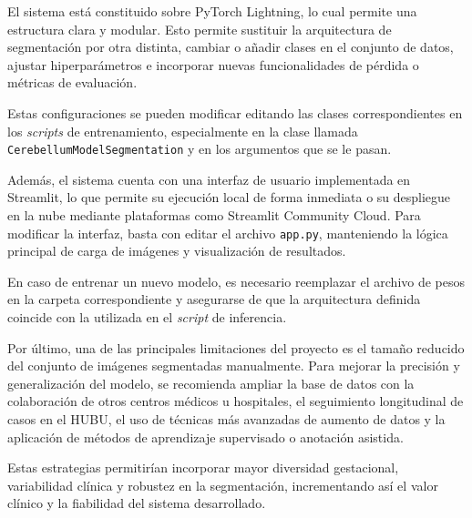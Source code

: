 El sistema está constituido sobre PyTorch Lightning, lo cual permite una estructura clara y modular. Esto permite sustituir la arquitectura de segmentación por otra distinta, cambiar o añadir clases en el conjunto de datos, ajustar hiperparámetros e incorporar nuevas funcionalidades de pérdida o métricas de evaluación.

Estas configuraciones se pueden modificar editando las clases correspondientes en los \textit{scripts} de entrenamiento, especialmente en la clase llamada \texttt{CerebellumModelSegmentation} y en los argumentos que se le pasan.

Además, el sistema cuenta con una interfaz de usuario implementada en Streamlit, lo que permite su ejecución local de forma inmediata o su despliegue en la nube mediante plataformas como Streamlit Community Cloud. Para modificar la interfaz, basta con editar el archivo \texttt{app.py}, manteniendo la lógica principal de carga de imágenes y visualización de resultados.

En caso de entrenar un nuevo modelo, es necesario reemplazar el archivo de pesos en la carpeta correspondiente y asegurarse de que la arquitectura definida coincide con la utilizada en el \textit{script} de inferencia.

Por último, una de las principales limitaciones del proyecto es el tamaño reducido del conjunto de imágenes segmentadas manualmente. Para mejorar la precisión y generalización del modelo, se recomienda ampliar la base de datos con la colaboración de otros centros médicos u hospitales, el seguimiento longitudinal de casos en el HUBU, el uso de técnicas más avanzadas de aumento de datos y la aplicación de métodos de aprendizaje supervisado o anotación asistida.

Estas estrategias permitirían incorporar mayor diversidad gestacional, variabilidad clínica y robustez en la segmentación, incrementando así el valor clínico y la fiabilidad del sistema desarrollado.